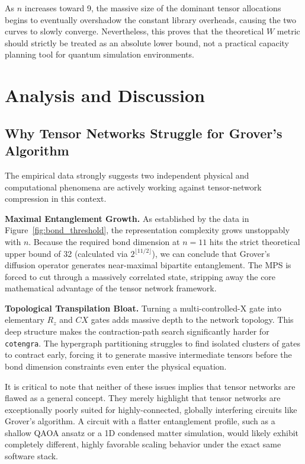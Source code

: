 \documentclass[sigconf, authorversion, nonacm]{acmart}
\begin{document}
As $n$ increases toward 9, the massive size of the dominant tensor allocations begins to eventually overshadow the constant library overheads, causing the two curves to slowly converge. Nevertheless, this proves that the theoretical $W$ metric should strictly be treated as an absolute lower bound, not a practical capacity planning tool for quantum simulation environments.

\section{Analysis and Discussion}

\subsection{Why Tensor Networks Struggle for Grover's Algorithm}

The empirical data strongly suggests two independent physical and computational phenomena are actively working against tensor-network compression in this context.

\textbf{Maximal Entanglement Growth.} As established by the data in Figure~\ref{fig:bond_threshold}, the representation complexity grows unstoppably with $n$. Because the required bond dimension at $n=11$ hits the strict theoretical upper bound of 32 (calculated via $2^{\lfloor 11/2 \rfloor}$), we can conclude that Grover's diffusion operator generates near-maximal bipartite entanglement. The MPS is forced to cut through a massively correlated state, stripping away the core mathematical advantage of the tensor network framework.

\textbf{Topological Transpilation Bloat.} Turning a multi-controlled-X gate into elementary $R_z$ and $CX$ gates adds massive depth to the network topology. This deep structure makes the contraction-path search significantly harder for \texttt{cotengra}. The hypergraph partitioning struggles to find isolated clusters of gates to contract early, forcing it to generate massive intermediate tensors before the bond dimension constraints even enter the physical equation.

It is critical to note that neither of these issues implies that tensor networks are flawed as a general concept. They merely highlight that tensor networks are exceptionally poorly suited for highly-connected, globally interfering circuits like Grover's algorithm. A circuit with a flatter entanglement profile, such as a shallow QAOA ansatz or a 1D condensed matter simulation, would likely exhibit completely different, highly favorable scaling behavior under the exact same software stack.
\end{document}
